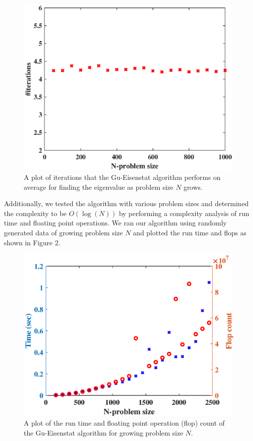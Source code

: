 \documentclass[onecolumn]{webofc}
\begin{document}
\begin{figure}
\begin{center}
\includegraphics[scale=.7]{graphics/iters.eps}
\caption{A plot of iterations that the Gu-Eisenstat algorithm performs on average for finding the eigenvalue as problem size $N$ grows.}
\end{center}
\end{figure}
	
	Additionally, we tested the algorithm with various problem sizes and determined the complexity to be $O(\log(N))$ by performing a complexity analysis of run time and floating point operations. We ran our algorithm using randomly generated data of growing problem size $N$ and plotted the run time and flops as shown in Figure 2.

\begin{figure}
\begin{center}
\includegraphics[scale=.7]{graphics/flops2500.eps}
\caption{A plot of the run time and floating point operation (flop) count of the Gu-Eisenstat algorithm for growing problem size $N$.}
\end{center}
\end{figure}	
\end{document}
